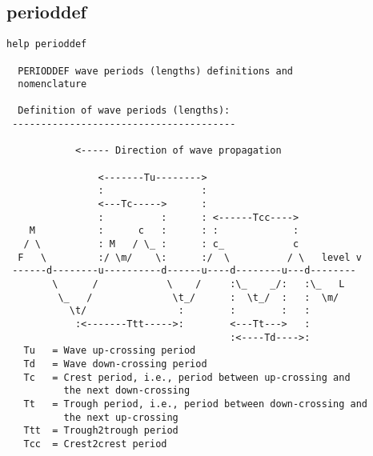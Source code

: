 \subsection{perioddef}
{\small\begin{verbatim}
help perioddef

  PERIODDEF wave periods (lengths) definitions and
  nomenclature

  Definition of wave periods (lengths):
 ---------------------------------------

            <----- Direction of wave propagation

                <-------Tu-------->
                :                 :
                <---Tc----->      :
                :          :      : <------Tcc---->
    M           :      c   :      : :             :
   / \          : M   / \_ :      : c_            c
  F   \         :/ \m/    \:      :/  \          / \   level v
 ------d--------u----------d------u----d--------u---d--------
        \      /            \    /     :\_    _/:   :\_   L
         \_   /              \t_/      :  \t_/  :   :  \m/
           \t/                :        :        :   :
            :<-------Ttt----->:        <---Tt--->   :
                                       :<----Td---->:
   Tu   = Wave up-crossing period
   Td   = Wave down-crossing period
   Tc   = Crest period, i.e., period between up-crossing and
          the next down-crossing
   Tt   = Trough period, i.e., period between down-crossing and
          the next up-crossing
   Ttt  = Trough2trough period
   Tcc  = Crest2crest period
\end{verbatim}
}

